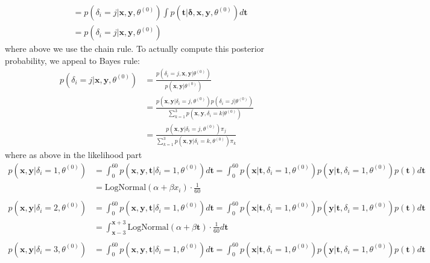 \documentclass{article}
\begin{document}
\begin{itemize}
\begin{enumerate}[label=(\alph*)]
\begin{enumerate}[label=(\arabic*)]
\begin{align*}
            &= p(\delta_i = j | \mathbf{x}, \mathbf{y}, \theta^{(0)}) \int  p(\mathbf{t}  | \mathbf{\delta}, \mathbf{x}, \mathbf{y}, \theta^{(0)}) d\mathbf{t}\\
            &= p(\delta_i = j | \mathbf{x}, \mathbf{y}, \theta^{(0)})
          \end{align*}
          where above we use the chain rule. To actually compute this posterior probability, we appeal to Bayes rule:
          \begin{align*}
            p(\delta_i = j | \mathbf{x}, \mathbf{y}, \theta^{(0)}) &= \frac{p(\delta_i = j,  \mathbf{x}, \mathbf{y} | \theta^{(0)})}{p(\mathbf{x}, \mathbf{y} | \theta^{(0)})} \\
            &= \frac{p( \mathbf{x}, \mathbf{y} |\delta_i = j,  \theta^{(0)}) p(\delta_i = j | \theta^{(0)})}{\sum_{k=1}^{3}p(\mathbf{x}, \mathbf{y}, \delta_i = k | \theta^{(0)})} \\
            &= \frac{p( \mathbf{x}, \mathbf{y} |\delta_i = j,  \theta^{(0)}) \pi_j}{\sum_{k=1}^{3}p(\mathbf{x}, \mathbf{y}| \delta_i = k, \theta^{(0)}) \pi_k}
          \end{align*}
          where as above in the likelihood part
          \begin{align*}
            p( \mathbf{x}, \mathbf{y} |\delta_i = 1,  \theta^{(0)}) &= \int_{0}^{60} p( \mathbf{x}, \mathbf{y}, \mathbf{t} |\delta_i = 1,  \theta^{(0)}) d\mathbf{t} = \int_{0}^{60} p( \mathbf{x} | \mathbf{t}, \delta_i = 1,  \theta^{(0)}) p( \mathbf{y} | \mathbf{t}, \delta_i = 1,  \theta^{(0)}) p( \mathbf{t})  d\mathbf{t} \\
            &=  \text{LogNormal}(\alpha + \beta x_i) \cdot \frac{1}{60} \\
            \\
            p( \mathbf{x}, \mathbf{y} |\delta_i = 2,  \theta^{(0)}) &= \int_{0}^{60} p( \mathbf{x}, \mathbf{y}, \mathbf{t} |\delta_i = 1,  \theta^{(0)}) d\mathbf{t} = \int_{0}^{60} p( \mathbf{x} | \mathbf{t}, \delta_i = 1,  \theta^{(0)}) p( \mathbf{y} | \mathbf{t}, \delta_i = 1,  \theta^{(0)}) p( \mathbf{t})  d\mathbf{t} \\
            &=  \int_{\mathbf{x} - 3}^{\mathbf{x} + 3}\text{LogNormal}(\alpha + \beta \mathbf{t}) \cdot \frac{1}{60} d\mathbf{t} \\
            \\
            p( \mathbf{x}, \mathbf{y} |\delta_i = 3,  \theta^{(0)}) &= \int_{0}^{60} p( \mathbf{x}, \mathbf{y}, \mathbf{t} |\delta_i = 1,  \theta^{(0)}) d\mathbf{t} = \int_{0}^{60} p( \mathbf{x} | \mathbf{t}, \delta_i = 1,  \theta^{(0)}) p( \mathbf{y} | \mathbf{t}, \delta_i = 1,  \theta^{(0)}) p( \mathbf{t})  d\mathbf{t} \\

\end{align*}
\end{enumerate}
\end{enumerate}
\end{itemize}
\end{document}
